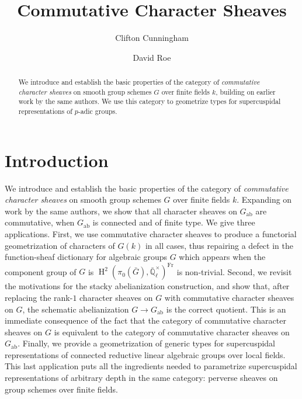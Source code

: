 \documentclass[10pt]{amsart}
\title[Commutative Character Sheaves]{Commutative Character Sheaves}
\author{Clifton Cunningham}
\author{David Roe}
\theoremstyle{plain}
\theoremstyle{definition}
\newcommand{\EE}{\mathbb{\bar Q}_\ell}
\newcommand{\Fq}{k}
\newcommand{\EEx}{\EE^\times}
\newcommand{\Frob}[1]{\operatorname{Fr}_{#1}}
\DeclareMathOperator{\Hh}{H}
\newcommand{\ab}{_{\operatorname{ab}}}
\newcommand{\bG}{\bar{G}}
\begin{document}
\begin{abstract}
We introduce and establish the basic properties of  the category of \emph{commutative character sheaves} on smooth group schemes $G$ over finite fields $\Fq$, building on earlier work by the same authors.
We use this category to geometrize types for supercuspidal representations of $p$-adic groups. 
\end{abstract}

\maketitle

\tableofcontents

\section*{Introduction}
We introduce and establish the basic properties of  the category of \emph{commutative character sheaves} on smooth group schemes $G$ over finite fields $\Fq$. 
Expanding on work by the same authors, we show that all character sheaves on $G\ab$ are commutative, when $G\ab$ is connected and of finite type.
We give three applications.
First, we use commutative character sheaves to produce a functorial geometrization of characters of $G(\Fq)$ in all cases, thus repairing a defect in the function-sheaf dictionary for algebraic groups $G$ which appears when the component group of $G$ is $\Hh^2(\pi_0(\bG),\EEx)^{\Frob{}}$ is non-trivial. 
Second, we revisit the motivations for the stacky abelianization construction, and show that, after replacing the rank-$1$ character sheaves on $G$ with commutative character sheaves on $G$, the schematic abelianization $G \to G\ab$ is the correct quotient.
This is an immediate consequence of the fact that the category of commutative character sheaves on $G$ is equivalent to the category of commutative character sheaves on $G\ab$. 
Finally, we provide a geometrization of generic types for supercuspidal representations of connected reductive linear algebraic groups over local fields.
This last application puts all the ingredients needed to parametrize supercuspidal representations of arbitrary depth in the same category: perverse sheaves on group schemes over finite fields.
\end{document}
